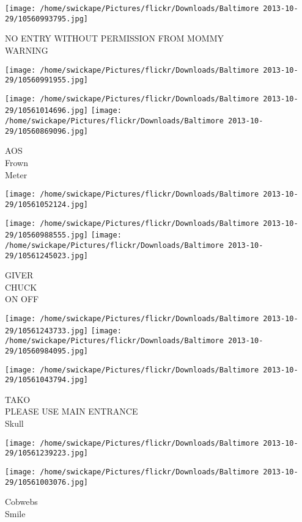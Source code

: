 \documentclass[10pt,letterpaper]{article}
\begin{document}
\vspace{0.25in}
\texttt{[image: /home/swickape/Pictures/flickr/Downloads/Baltimore 2013-10-29/10560993795.jpg]}

NO ENTRY WITHOUT PERMISSION FROM MOMMY\\
WARNING
\pagebreak

\texttt{[image: /home/swickape/Pictures/flickr/Downloads/Baltimore 2013-10-29/10560991955.jpg]}

\vspace{0.25in}
\texttt{[image: /home/swickape/Pictures/flickr/Downloads/Baltimore 2013-10-29/10561014696.jpg]}
\texttt{[image: /home/swickape/Pictures/flickr/Downloads/Baltimore 2013-10-29/10560869096.jpg]}

AOS\\
Frown\\
Meter
\pagebreak

\texttt{[image: /home/swickape/Pictures/flickr/Downloads/Baltimore 2013-10-29/10561052124.jpg]}

\vspace{0.25in}
\texttt{[image: /home/swickape/Pictures/flickr/Downloads/Baltimore 2013-10-29/10560988555.jpg]}
\texttt{[image: /home/swickape/Pictures/flickr/Downloads/Baltimore 2013-10-29/10561245023.jpg]}

GIVER\\
CHUCK\\
ON OFF
\pagebreak

\texttt{[image: /home/swickape/Pictures/flickr/Downloads/Baltimore 2013-10-29/10561243733.jpg]}
\texttt{[image: /home/swickape/Pictures/flickr/Downloads/Baltimore 2013-10-29/10560984095.jpg]}

\texttt{[image: /home/swickape/Pictures/flickr/Downloads/Baltimore 2013-10-29/10561043794.jpg]}

TAKO\\
PLEASE USE MAIN ENTRANCE\\
Skull
\pagebreak

\texttt{[image: /home/swickape/Pictures/flickr/Downloads/Baltimore 2013-10-29/10561239223.jpg]}

\vspace{0.25in}
\texttt{[image: /home/swickape/Pictures/flickr/Downloads/Baltimore 2013-10-29/10561003076.jpg]}

Cobwebs\\
Smile
\pagebreak
\end{document}
